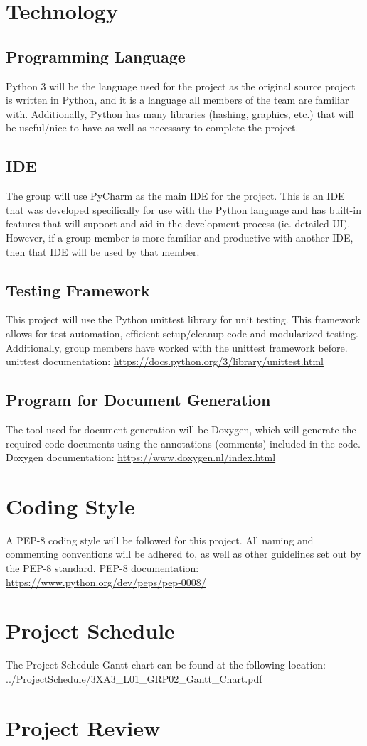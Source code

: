 \documentclass{article}
\begin{document}
\section{Technology}
\subsection{Programming Language}
Python 3 will be the language used for the project as the original source project is written in Python, and it is a language all members of the team are familiar with.
Additionally, Python has many libraries (hashing, graphics, etc.) that will be useful/nice-to-have as well as necessary to complete the project. 
\subsection{IDE}
The group will use PyCharm as the main IDE for the project. This is an IDE that was developed specifically for use with the Python language and has built-in features that will support and aid in the development process (ie. detailed UI).
However, if a group member is more familiar and productive with another IDE, then that IDE will be used by that member.
\subsection{Testing Framework}
This project will use the Python unittest library for unit testing. This framework allows for test automation, efficient setup/cleanup code and modularized testing. Additionally, group members have worked with
the unittest framework before.
unittest documentation: \href{https://docs.python.org/3/library/unittest.html}{https://docs.python.org/3/library/unittest.html}
\subsection{Program for Document Generation}
The tool used for document generation will be Doxygen, which will generate the required code documents using the annotations (comments) included in the code.
Doxygen documentation: \href{https://www.doxygen.nl/index.html}{https://www.doxygen.nl/index.html}
\section{Coding Style}
A PEP-8 coding style will be followed for this project. All naming and commenting conventions will be adhered to, as well as other guidelines set out by the PEP-8 standard.
PEP-8 documentation: \href{https://www.python.org/dev/peps/pep-0008/}{https://www.python.org/dev/peps/pep-0008/}
\section{Project Schedule}

The Project Schedule Gantt chart can be found at the following location:\\
../ProjectSchedule/3XA3\_L01\_GRP02\_Gantt\_Chart.pdf

\section{Project Review}
\end{document}
